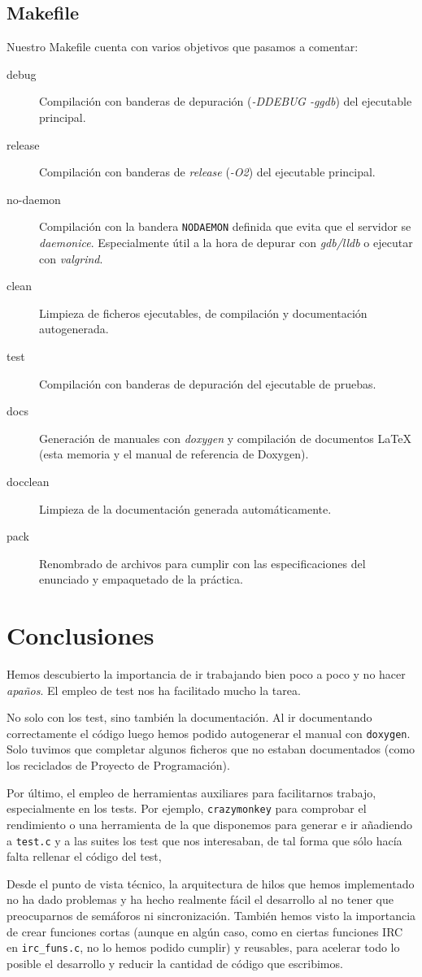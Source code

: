 \documentclass{article}
\begin{document}
\subsection{Makefile}

Nuestro Makefile cuenta con varios objetivos que pasamos a comentar:

\begin{description}
\item[debug] Compilación con banderas de depuración (\textit{-DDEBUG -ggdb}) del ejecutable principal.
\item[release] Compilación con banderas de \textit{release} (\textit{-O2}) del ejecutable principal.
\item[no-daemon] Compilación con la bandera \texttt{NODAEMON} definida que evita que el servidor se \textit{daemonice}. Especialmente útil a la hora de depurar con \textit{gdb/lldb} o ejecutar con \textit{valgrind}.
\item[clean] Limpieza de ficheros ejecutables, de compilación y documentación autogenerada.
\item[test] Compilación con banderas de depuración del ejecutable de pruebas.
\item[docs] Generación de manuales con \textit{doxygen} y compilación de documentos LaTeX (esta memoria y el manual de referencia de Doxygen). 
\item[docclean] Limpieza de la documentación generada automáticamente.
\item[pack] Renombrado de archivos para cumplir con las especificaciones del enunciado y empaquetado de la práctica.
\end{description}

\section{Conclusiones}

Hemos descubierto la importancia de ir trabajando bien poco a poco y no hacer \textit{apaños}. El empleo de test nos ha facilitado mucho la tarea. 

No solo con los test, sino también la documentación. Al ir documentando correctamente el código luego hemos podido autogenerar el manual con \texttt{doxygen}. Solo tuvimos que completar algunos ficheros que no estaban documentados (como los reciclados de Proyecto de Programación).

Por último, el empleo de herramientas auxiliares para facilitarnos trabajo, especialmente en los tests. Por ejemplo, \texttt{crazymonkey} para comprobar el rendimiento o una herramienta de la que disponemos para generar e ir añadiendo a \texttt{test.c} y a las suites los test que nos interesaban, de tal forma que sólo hacía falta rellenar el código del test, 

Desde el punto de vista técnico, la arquitectura de hilos que hemos implementado no ha dado problemas y ha hecho realmente fácil el desarrollo al no tener que preocuparnos de semáforos ni sincronización. También hemos visto la importancia de crear funciones cortas (aunque en algún caso, como en ciertas funciones IRC en \texttt{irc\_funs.c}, no lo hemos podido cumplir) y reusables, para acelerar todo lo posible el desarrollo y reducir la cantidad de código que escribimos.
\end{document}
